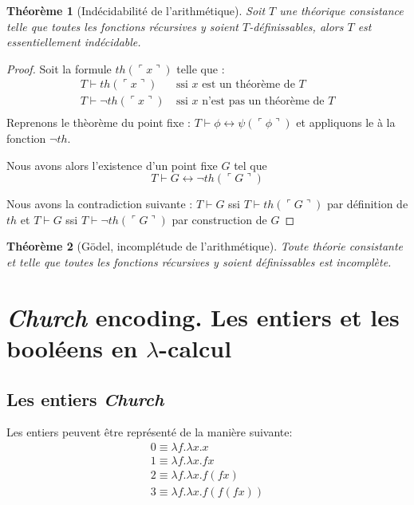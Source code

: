 \documentclass[11pt]{book}
\newtheorem{theoreme}{Théorème}
\begin{document}
\begin{theoreme}[Indécidabilité de l'arithmétique]
	Soit $T$ une théorique consistance telle que toutes les fonctions récursives
	y soient $T$-définissables, alors $T$ est essentiellement indécidable.
\end{theoreme}
\begin{proof}
        Soit la formule $th(\ulcorner x \urcorner)$ telle que :
	\begin{align*}
	T \vdash th(\ulcorner x \urcorner) \ &\text{ssi $x$ est un théorème de $T$} \\
	T \vdash \neg th(\ulcorner x \urcorner) \ &\text{ssi $x$ n'est pas un théorème de $T$} \\
	\end{align*}
	Reprenons le thèorème du point fixe :
	 $ T \vdash \phi \leftrightarrow \psi (\ulcorner \phi\urcorner ) $ et appliquons le à
	 la fonction $\neg th$.
	 
	 Nous avons alors l'existence d'un point fixe $G$ tel que
	  $$T \vdash G \leftrightarrow \neg th (\ulcorner G \urcorner ) $$ 

	  Nous avons la contradiction suivante : $T \vdash G$ ssi $T \vdash th(\ulcorner G \urcorner)$ par définition de $th$
	  et $T \vdash G$ ssi $T \vdash \neg th (\ulcorner G \urcorner)$ par construction de $G$
\end{proof}

\begin{theoreme}[Gödel, incomplétude de l'arithmétique]
	Toute théorie consistante et telle que toutes les fonctions récursives y soient définissables
	est incomplète.	
\end{theoreme}


\section{\textit{Church} encoding. Les entiers et les booléens en $\lambda$-calcul}
\subsection{Les entiers \textit{Church} }
Les entiers peuvent être représenté de la manière suivante:
$$
\begin{array}{l}
0 \equiv \lambda f.\lambda x.x \\
1 \equiv \lambda f.\lambda x.f x \\
2 \equiv \lambda f.\lambda x.f (f x) \\
3 \equiv \lambda f.\lambda x.f (f (f x)) 
\end{array}
$$
\end{document}
